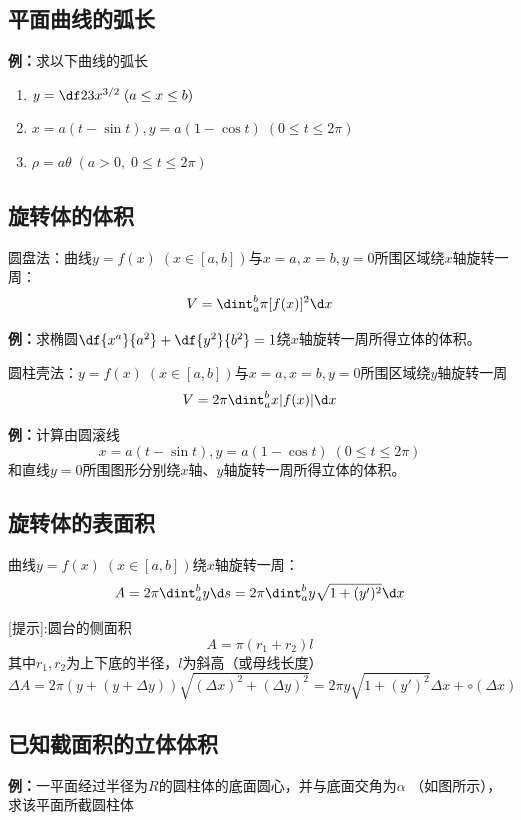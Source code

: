 \subsection{平面曲线的弧长}

{\bf 例：}求以下曲线的弧长
\begin{enumerate}[(1)]
  \setlength{\itemindent}{1cm}
  \item $y=\df 23x^{3/2}\;(a\leq x\leq b)$
  \item $x=a(t-\sin t),y=a(1-\cos t)\;(0\leq t\leq 2\pi)$
  \item $\rho=a\theta\;(a>0,\;0\leq t\leq 2\pi)$
\end{enumerate}

\subsection{旋转体的体积}

圆盘法：曲线$y=f(x)\;(x\in[a,b])$与$x=a,x=b,y=0$所围区域绕$x$轴旋转一周：
$$V=\dint_a^b\pi[f(x)]^2\d x$$

{\bf 例：}求椭圆$\df{x^a}{a^2}+\df{y^2}{b^2}=1$绕$x$轴旋转一周所得立体的体积。

圆柱壳法：$y=f(x)\;(x\in[a,b])$与$x=a,x=b,y=0$所围区域绕$y$轴旋转一周
$$V=2\pi\dint_a^bx|f(x)|\d x$$

{\bf 例：}计算由圆滚线$$x=a(t-\sin t),y=a(1-\cos t)\;(0\leq t\leq 2\pi)$$
和直线$y=0$所围图形分别绕$x$轴、$y$轴旋转一周所得立体的体积。

\subsection{旋转体的表面积}
曲线$y=f(x)\;(x\in[a,b])$绕$x$轴旋转一周：
$$A=2\pi \dint_a^by\d s=2\pi \dint_a^by\sqrt{1+(y')^2}\d x$$

[提示]:圆台的侧面积
$$A=\pi(r_1+r_2)l$$
其中$r_1,r_2$为上下底的半径，$l$为斜高（或母线长度）
$$\Delta A=2\pi(y+(y+\Delta y))\sqrt{(\Delta x)^2+(\Delta y)^2}
=2\pi y\sqrt{1+(y')^2}\Delta x+\circ(\Delta x)$$

\subsection{已知截面积的立体体积}

{\bf 例：}一平面经过半径为$R$的圆柱体的底面圆心，并与底面交角为$\alpha$
（如图所示），求该平面所截圆柱体

